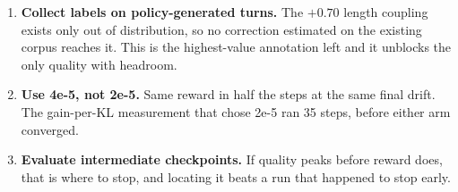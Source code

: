 \documentclass[11pt]{article}
\begin{document}
\begin{enumerate}
\item \textbf{Collect labels on policy-generated turns.} The $+0.70$ length coupling exists only out of
distribution, so no correction estimated on the existing corpus reaches it. This is the highest-value
annotation left and it unblocks the only quality with headroom.
\item \textbf{Use 4e-5, not 2e-5.} Same reward in half the steps at the same final drift. The gain-per-KL
measurement that chose 2e-5 ran 35 steps, before either arm converged.
\item \textbf{Evaluate intermediate checkpoints.} If quality peaks before reward does, that is where to
stop, and locating it beats a run that happened to stop early.
\end{enumerate}
\end{document}
